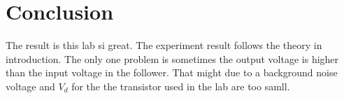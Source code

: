 \documentclass[aps,prl,reprint]{revtex4-1}
\begin{document}
\section{Conclusion}
The result is this lab si great. The experiment result follows the theory in introduction. The only one problem is sometimes the output voltage is higher than the input voltage in the follower. That might due to a background noise voltage and $V_d$ for the the transistor used in the lab are too samll.










\end{document}
